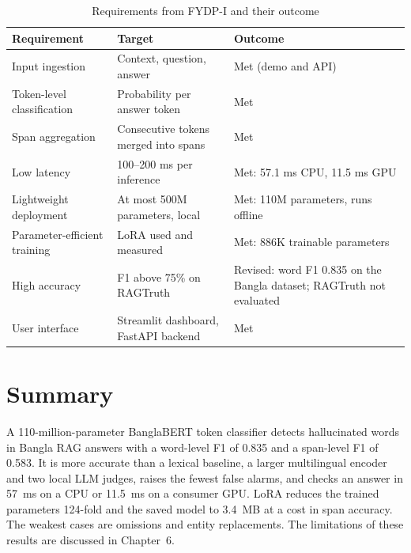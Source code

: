 \begin{table}[htbp]
\centering
\small
\caption{Requirements from FYDP-I and their outcome}
\label{tab:requirements}
\begin{tabular}{p{4.2cm}p{4.2cm}p{4.6cm}}
\hline
\textbf{Requirement} & \textbf{Target} & \textbf{Outcome} \\
\hline
Input ingestion & Context, question, answer & Met (demo and API) \\
Token-level classification & Probability per answer token & Met \\
Span aggregation & Consecutive tokens merged into spans & Met \\
Low latency & 100--200 ms per inference & Met: 57.1 ms CPU, 11.5 ms GPU \\
Lightweight deployment & At most 500M parameters, local & Met: 110M parameters, runs offline \\
Parameter-efficient training & LoRA used and measured & Met: 886K trainable parameters \\
High accuracy & F1 above 75\% on RAGTruth & Revised: word F1 0.835 on the Bangla dataset; RAGTruth not evaluated \\
User interface & Streamlit dashboard, FastAPI backend & Met \\
\hline
\end{tabular}
\end{table}


\section{Summary}
\label{sec:ch4summary}

A 110-million-parameter BanglaBERT token classifier detects hallucinated words
in Bangla RAG answers with a word-level F1 of 0.835 and a span-level F1 of
0.583. It is more accurate than a lexical baseline, a larger multilingual
encoder and two local LLM judges, raises the fewest false alarms, and checks an
answer in 57~ms on a CPU or 11.5~ms on a consumer GPU. LoRA reduces the trained
parameters 124-fold and the saved model to 3.4~MB at a cost in span accuracy.
The weakest cases are omissions and entity replacements. The limitations of
these results are discussed in Chapter~6.
